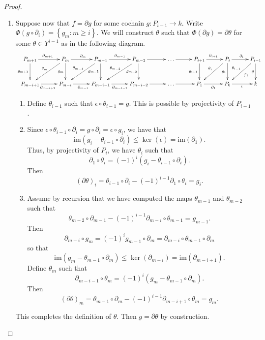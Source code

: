 \documentclass[12pt]{article}
\newcounter{savedenumii}
\begin{document}
\begin{proof}
\begin{enumerate}
\item\label{dg}
Suppose now that $f=\partial g$ for some cochain $g:P_{i-1}\to k$.
Write $\Phi\left(g\circ\partial_i\right)=\left\{
g_m:m\ge i\right\}$. We will construct $\theta$ such
that $\Phi\left(\partial g\right)=
\partial\theta$ for some $\theta\in Y^{i-1}$ as in the
following diagram.
\[\begin{xy}{\xymatrix@+5pt{
P_{m+1}\ar[r]^{\partial_{m+1}}\ar[d]_{g_{m+1}}
&P_m\ar[r]^{\partial_m}\ar[d]_{g_m}\ar[dl]_{\theta_m}
&P_{m-1}\ar[r]^{\partial_{m-1}}
\ar[d]_{g_{m-1}}\ar[dl]_{\theta_{m-1}}
&P_{m-2}\ar[r]\ar[d]_{g_{m-2}}\ar[dl]_{\theta_{m-2}}
&\dots\ar[r]
&P_{i+1}\ar[r]^{\partial_{i+1}}\ar[d]_{g_{i+1}}
&P_i\ar[d]_{g_i}\ar[r]^{\partial_i}\ar[dl]_{\theta_i}
&P_{i-1}\ar[d]_g\ar[dl]_{\theta_{i-1}}
\\
P_{m-i+1}\ar[r]_{\partial_{m-i+1}}
&P_{m-i}\ar[r]_{\partial_{m-i}}
&P_{m-i-1}\ar[r]_{\partial_{m-i-1}}
&P_{m-i-2}\ar[r]
&\dots\ar[r]
&P_1\ar[r]_{\partial_1}
&P_0\ar[r]_{\epsilon}
&k}};
"2,8";"1,7"**{};
?(.35)*{\circlearrowright}
\end{xy}\]
\begin{enumerate}
\setcounter{enumii}{\value{savedenumii}}
\item Define $\theta_{i-1}$ such that $\epsilon\circ\theta_{i-1}=g$.
This is possible by projectivity of $P_{i-1}$.
\item Since $\epsilon\circ\theta_{i-1}\circ\partial_i
=g\circ\partial_i=\epsilon\circ g_i$, we have that
\[\mathrm{im}\left(g_i-\theta_{i-1}\circ\partial_i\right)
\le\ker\left(\epsilon\right) =\mathrm{im}\left(\partial_1\right).\]
Thus, by projectivity of $P_i$, we have $\theta_i$ such that
\[\partial_1\circ\theta_i
=\left(-1\right)^i\left(g_i-\theta_{i-1}\circ\partial_i\right).\]
Then
\[\left(\partial\theta\right)_i=
\theta_{i-1}\circ\partial_i-\left(-1\right)^{i-1}\partial_1\circ\theta_i=g_i.\]
\item Assume by recursion that we have computed the maps
$\theta_{m-1}$ and $\theta_{m-2}$ such that
\[\theta_{m-2}\circ\partial_{m-1}
-\left(-1\right)^{i-1}\partial_{m-i}\circ\theta_{m-1}
= g_{m-1}.\]
Then
\[\partial_{m-i}\circ g_m=\left(-1\right)^i
g_{m-1}\circ\partial_m
=\partial_{m-i}\circ\theta_{m-1}\circ\partial_m\]
so that
\[\mathrm{im}\left(g_m-\theta_{m-1}\circ\partial_m\right)
\le\ker\left(\partial_{m-i}\right)=\mathrm{im}
\left(\partial_{m-i+1}\right).\] 
Define $\theta_m$ such that
\[\partial_{m-i-1}\circ\theta_m=
\left(-1\right)^i\left(g_m-\theta_{m-1}\circ\partial_m\right).\]
Then
\[\left(\partial\theta\right)_m=
\theta_{m-1}\circ\partial_m-\left(-1\right)^{i-1}
\partial_{m-i+1}\circ\theta_m=g_m.\]
\end{enumerate}
This completes the definition of $\theta$.
Then $g=\partial\theta$ by construction.


\end{enumerate}
\end{proof}
\end{document}
